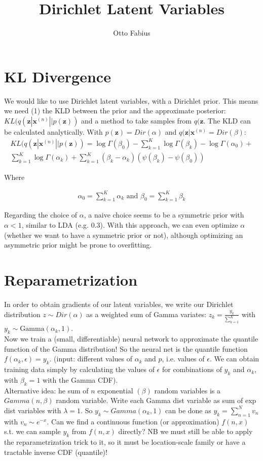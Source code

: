 \documentclass{article}
\author{Otto Fabius}
\title{Dirichlet Latent Variables}
\begin{document}
\maketitle

\section{KL Divergence}

We would like to use Dirichlet latent variables, with a Dirichlet prior. This means we need (1) the KLD between the prior and the approximate posterior: $KL(q(\mathbf{z}|\mathbf{x}^{(n)}||p(\mathbf{z}))$ and a method to take samples from $q(\mathbf{z}$. The KLD can be calculated analytically.
With $p(\mathbf{z}) = Dir(\alpha)$ and $q(\mathbf{z}|\mathbf{x}^{(n)} = Dir(\beta)$:
\begin{align}
KL(q(\mathbf{z}|\mathbf{x}^{(n)}||p(\mathbf{z})) = \log \Gamma(\beta_0) - \sum_{k=1}^K\log\Gamma(\beta_k)-\log\Gamma(\alpha_0)+ \\
\sum_{k=1}^K\log\Gamma(\alpha_k)+ \sum_{k=1}^K(\beta_k - \alpha_k)(\psi(\beta_k)-\psi(\beta_0))
\end{align}

Where

\begin{align}
\alpha_0 = \sum_{k=1}^{K}\alpha_k \text{ and } \beta_0 = \sum_{k=1}^{K}\beta_k
\end{align}


Regarding the choice of $\alpha$, a naive choice seems to be a symmetric prior with $\alpha < 1$, similar to LDA (e.g. $0.3$). With this approach, we can even optimize $\alpha$ (whether we want to have a symmetric prior or not), although optimizing an asymmetric prior might be prone to overfitting.

\section{Reparametrization}

In order to obtain gradients of our latent variables, we write our Dirichlet distribution $z \sim Dir(\alpha)$ as a weighted sum of Gamma variates: $z_k = \frac{y_k}{\sum_{k=1}^{K}}$ with $y_k \sim \text{Gamma}(\alpha_k,1)$. \\
Now we train a (small, differentiable) neural network to approximate the quantile function of the Gamma distribution! So the neural net is the quantile function $f(\alpha_k, \epsilon) = y_k$. (input: different values of $\alpha_k$  and $p$, i.e. values of $\epsilon$. We can obtain training data simply by calculating the values of $\epsilon$ for combinations of $y_k$ and $\alpha_k$, with $\beta_k = 1$ with the Gamma CDF). \\
Alternative idea: he sum of $n$  exponential $(\beta)$ random variables is a $Gamma(n, \beta)$ random variable. Write each Gamma dist variable as sum of exp dist variables with $\lambda = 1$. So $y_k \sim Gamma(\alpha_k,1)$ can be done as $y_k = \sum_{n=1}^{N}v_n$ with $v_n \sim e^{-x}$. Can we find a continuous function (or approximation) $f(n,x)$ s.t. we can sample $y_k$ from $f(n,x)$ directly? NB we must still be able to apply the reparametrization trick to it, so it must be location-scale family or have a tractable inverse CDF (quantile)! 
\end{document}
